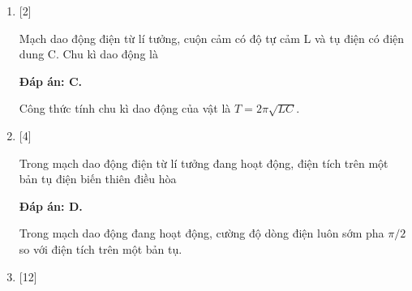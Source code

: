 \begin{enumerate}[label=\bfseries Câu \arabic*:]
{	}

	\item {} [2] %
	
	\cauhoi
	{Mạch dao động điện từ lí tưởng, cuộn cảm có độ tự cảm L và tụ điện có điện dung C. Chu kì dao động là
	}
	
	\loigiai
	{		\textbf{Đáp án: C.}
		
		Công thức  tính chu kì dao động của vật là $T = 2\pi \sqrt{LC}$.
		
	}

	\item {} [4] %
	
	\cauhoi
	{Trong mạch dao động điện từ lí tưởng đang hoạt động, điện tích trên một bản tụ điện biến thiên điều hòa
	}
	
	\loigiai
	{		\textbf{Đáp án: D.}
		
		Trong mạch dao động đang hoạt động, cường độ dòng điện luôn sớm pha $\pi /2$ so với điện tích trên một bản tụ.
		
	}

	\item {} [12] %
	

\end{enumerate}

